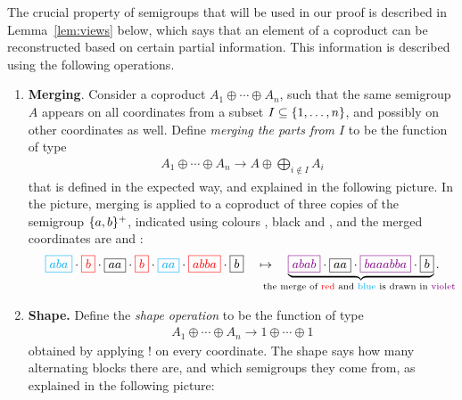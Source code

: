 
The crucial property of semigroups that will be used in our proof is described in Lemma~\ref{lem:views} below, which says that an element of a coproduct can be reconstructed based on certain partial information. This information is described  using the following operations.

\begin{enumerate}
    \item \textbf{Merging}. Consider a coproduct $A_1 \oplus \cdots \oplus A_n$, such that the same semigroup $A$ appears on all coordinates from a subset $I \subseteq \{1,\ldots,n\}$, and possibly on other coordinates as well. Define \emph{merging the parts from $I$} to be the function of type 
    \begin{align*}
        A_1 \oplus \cdots \oplus A_n \to  A \oplus \bigoplus_{i \not \in I} A_i
        \end{align*}
    that is defined in the expected way, and explained in the following picture. In the picture, merging is applied to  a coproduct of three copies of the semigroup $\{a,b\}^+$, indicated using colours , black and , and the merged coordinates are  and :
        \begin{align*}
        \blue{\boxed{aba}} \cdot 
        \red{\boxed{b}} \cdot 
        \boxed{aa} \cdot 
        \red{\boxed{b}} \cdot 
        \blue{\boxed{aa}} \cdot 
        \red{\boxed{abba}} \cdot 
        \boxed{b}
        \quad \mapsto \quad  
        \myunderbrace{
            \violet{\boxed{abab}} \cdot 
        \boxed{aa} \cdot 
        \violet{\boxed{baaabba}} \cdot 
        \boxed{b}
        }{the merge of \red{red} and \blue{blue} is drawn in \violet{violet}}.\end{align*}    
        \item \textbf {Shape.}  Define the \emph{shape operation} to be the function of type 
        \begin{align*}
        A_1 \oplus \cdots \oplus A_n \to 1 \oplus \cdots \oplus 1
        \end{align*}
        obtained by applying $!$ on every coordinate. The shape says how many alternating blocks there are, and which semigroups they come from, as explained in the following picture:
        \begin{align*}

\end{align*}
\end{enumerate}
